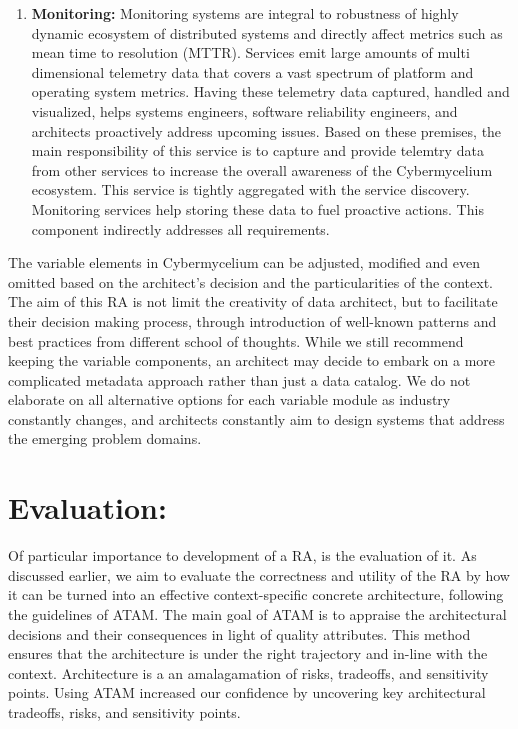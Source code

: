 \documentclass{bmcart}
\begin{document}
\begin{enumerate}
    \item \textbf{Monitoring:} Monitoring systems are integral to robustness of highly dynamic ecosystem of distributed systems and directly affect metrics such as mean time to resolution (MTTR). Services emit large amounts of multi dimensional telemetry data that covers a vast spectrum of platform and operating system metrics. Having these telemetry data captured, handled and visualized, helps systems engineers, software reliability engineers, and architects proactively address upcoming issues. Based on these premises, the main responsibility of this service is to capture and provide telemtry data from other services to increase the overall awareness of the Cybermycelium ecosystem. This service is tightly aggregated with the service discovery. Monitoring services help storing
    these data to fuel proactive actions. This component
    indirectly addresses all requirements.

\end{enumerate}

The variable elements in Cybermycelium can be adjusted, modified and even omitted based on the architect's decision and the particularities of the context. The aim of this RA is not limit the creativity of data architect, but to facilitate their decision making process, through introduction of well-known patterns and best practices from different school of thoughts. While we still recommend keeping the variable components, an architect may decide to embark on a more complicated metadata approach rather than just a data catalog. We do not elaborate on all alternative options for each variable module as industry constantly changes, and architects constantly aim to design systems that address the emerging problem domains. 


\section{Evaluation:} \label{evaluation-section}

Of particular importance to development of a RA, is the evaluation of it. As discussed earlier, we aim to evaluate the correctness and utility of the RA by how it can be turned into an effective context-specific concrete architecture, following the guidelines of ATAM. The main goal of ATAM is to appraise the architectural decisions and their consequences in light of quality attributes. This method ensures that the architecture is under the right trajectory and in-line with the context. Architecture is a an amalagamation of risks, tradeoffs, and sensitivity points. Using ATAM increased our confidence by uncovering key architectural tradeoffs, risks, and sensitivity points.
\end{document}
